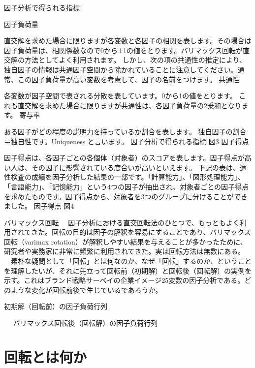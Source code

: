 \documentclass[a4j,11pt,mc]{jreport}
\begin{document}
因子分析で得られる指標

	因子負荷量

	直交解を求めた場合に限りますが各変数と各因子の相関を表します。その場合は因子負荷量は、相関係数なので0から±1の値をとります。バリマックス回転が直交解の方法としてよく利用されます。
	しかし、次の項の共通性の推定により、独自因子の情報は共通因子空間から除かれていることに注意してください。通常、この因子負荷量が高い変数を考慮して、因子の名前をつけます。
	共通性

	各変数が因子空間で表される分散を表しています。0から1の値をとります。
	これも直交解を求めた場合に限りますが共通性は、各因子負荷量の2乗和となります。
	寄与率

	ある因子がどの程度の説明力を持っているか割合を表します。
	独自因子の割合＝独自性です。Uniqueness と言います。
	因子分析で得られる指標
	図3
	因子得点

	因子得点は、各因子ごとの各個体（対象者）のスコアを表します。因子得点が高い人は、その因子に影響されている度合いが高いといえます。
	下記の表は、適性検査の成績を因子分析した結果の一部です。「計算能力」、「図形処理能力」、「言語能力」、「記憶能力」という4つの因子が抽出され、対象者ごとの因子得点を求めたものです。因子得点から、対象者を3つのグループに分けることができました。
	因子得点
	図4







	バリマックス回転
	　因子分析における直交回転法のひとつで、もっともよく利用されてきた。回転の目的は因子の解釈を容易にすることであり、バリマックス回転（varimax rotation）が解釈しやすい結果を与えることが多かったために、研究者や実務家に非常に頻繁に利用されてきた。実は回転方法は無数にある。
	　素朴な疑問として「回転」とは何なのか、なぜ「回転」するのか、ということを理解したいが、それに先立って回転前（初期解）と回転後（回転解）の実例を示す。これはブランド戦略サーベイの企業イメージ25変数の因子分析である。どのような変化が回転前後で生じているであろうか。

	初期解（回転前）の因子負荷行列　

	　
	バリマックス回転後（回転解）の因子負荷行列


\section{回転とは何か}
\end{document}
